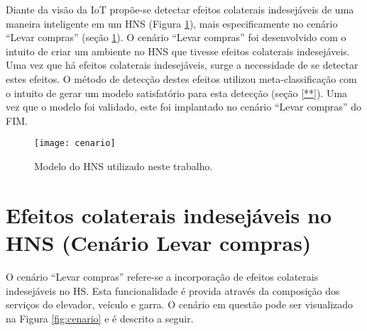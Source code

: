 Diante da visão da IoT propõe-se detectar efeitos colaterais indesejáveis de uma maneira inteligente em um HNS (Figura \ref{fig:hnsworkmodel}), mais especificamente no cenário ``Levar compras'' (seção \ref{sec:cenario}). O cenário ``Levar compras'' foi desenvolvido com o intuito de criar um ambiente no HNS que tivesse efeitos colaterais indesejáveis. Uma vez que há efeitos colaterais indesejáveis, surge a necessidade de se detectar estes efeitos. O método de detecção destes efeitos utilizou meta-classificação com o intuito de gerar um modelo satisfatório para esta detecção (seção \ref{**}). Uma vez que o modelo foi validado, este foi implantado no cenário ``Levar compras'' do FIM.

\begin{figure}[!htb] \centering 
  \centering
  \texttt{[image: cenario]} 
  \caption{Modelo do HNS utilizado neste trabalho.} 
  \label{fig:hnsworkmodel}
\end{figure}

\section{Efeitos colaterais indesejáveis no HNS (Cenário Levar compras)}
\label{sec:cenario}
O cenário ``Levar compras'' refere-se a incorporação de efeitos colaterais indesejáveis no HS. Esta funcionalidade é provida através da composição dos serviços do elevador, veículo e garra. O cenário em questão pode ser visualizado na Figura \ref{fig:cenario} e é descrito a seguir.

